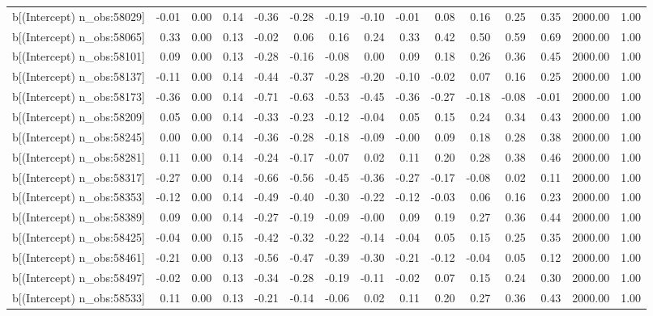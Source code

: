 \begin{table}[ht]
\begin{tabular}{rrrrrrrrrrrrrrr}
  b[(Intercept) n\_obs:58029] & -0.01 & 0.00 & 0.14 & -0.36 & -0.28 & -0.19 & -0.10 & -0.01 & 0.08 & 0.16 & 0.25 & 0.35 & 2000.00 & 1.00 \\ 
  b[(Intercept) n\_obs:58065] & 0.33 & 0.00 & 0.13 & -0.02 & 0.06 & 0.16 & 0.24 & 0.33 & 0.42 & 0.50 & 0.59 & 0.69 & 2000.00 & 1.00 \\ 
  b[(Intercept) n\_obs:58101] & 0.09 & 0.00 & 0.13 & -0.28 & -0.16 & -0.08 & 0.00 & 0.09 & 0.18 & 0.26 & 0.36 & 0.45 & 2000.00 & 1.00 \\ 
  b[(Intercept) n\_obs:58137] & -0.11 & 0.00 & 0.14 & -0.44 & -0.37 & -0.28 & -0.20 & -0.10 & -0.02 & 0.07 & 0.16 & 0.25 & 2000.00 & 1.00 \\ 
  b[(Intercept) n\_obs:58173] & -0.36 & 0.00 & 0.14 & -0.71 & -0.63 & -0.53 & -0.45 & -0.36 & -0.27 & -0.18 & -0.08 & -0.01 & 2000.00 & 1.00 \\ 
  b[(Intercept) n\_obs:58209] & 0.05 & 0.00 & 0.14 & -0.33 & -0.23 & -0.12 & -0.04 & 0.05 & 0.15 & 0.24 & 0.34 & 0.43 & 2000.00 & 1.00 \\ 
  b[(Intercept) n\_obs:58245] & 0.00 & 0.00 & 0.14 & -0.36 & -0.28 & -0.18 & -0.09 & -0.00 & 0.09 & 0.18 & 0.28 & 0.38 & 2000.00 & 1.00 \\ 
  b[(Intercept) n\_obs:58281] & 0.11 & 0.00 & 0.14 & -0.24 & -0.17 & -0.07 & 0.02 & 0.11 & 0.20 & 0.28 & 0.38 & 0.46 & 2000.00 & 1.00 \\ 
  b[(Intercept) n\_obs:58317] & -0.27 & 0.00 & 0.14 & -0.66 & -0.56 & -0.45 & -0.36 & -0.27 & -0.17 & -0.08 & 0.02 & 0.11 & 2000.00 & 1.00 \\ 
  b[(Intercept) n\_obs:58353] & -0.12 & 0.00 & 0.14 & -0.49 & -0.40 & -0.30 & -0.22 & -0.12 & -0.03 & 0.06 & 0.16 & 0.23 & 2000.00 & 1.00 \\ 
  b[(Intercept) n\_obs:58389] & 0.09 & 0.00 & 0.14 & -0.27 & -0.19 & -0.09 & -0.00 & 0.09 & 0.19 & 0.27 & 0.36 & 0.44 & 2000.00 & 1.00 \\ 
  b[(Intercept) n\_obs:58425] & -0.04 & 0.00 & 0.15 & -0.42 & -0.32 & -0.22 & -0.14 & -0.04 & 0.05 & 0.15 & 0.25 & 0.35 & 2000.00 & 1.00 \\ 
  b[(Intercept) n\_obs:58461] & -0.21 & 0.00 & 0.13 & -0.56 & -0.47 & -0.39 & -0.30 & -0.21 & -0.12 & -0.04 & 0.05 & 0.12 & 2000.00 & 1.00 \\ 
  b[(Intercept) n\_obs:58497] & -0.02 & 0.00 & 0.13 & -0.34 & -0.28 & -0.19 & -0.11 & -0.02 & 0.07 & 0.15 & 0.24 & 0.30 & 2000.00 & 1.00 \\ 
  b[(Intercept) n\_obs:58533] & 0.11 & 0.00 & 0.13 & -0.21 & -0.14 & -0.06 & 0.02 & 0.11 & 0.20 & 0.27 & 0.36 & 0.43 & 2000.00 & 1.00 \\ 

\end{tabular}
\end{table}
